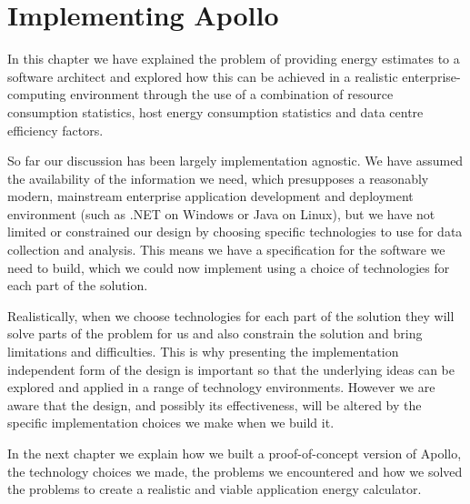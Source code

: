 \section{Implementing Apollo}

In this chapter we have explained the problem of providing energy estimates to a software architect and explored how this can be achieved in a realistic enterprise-computing environment through the use of a combination of resource consumption statistics, host energy consumption statistics and data centre efficiency factors.

So far our discussion has been largely implementation agnostic.  We have assumed the availability of the information we need, which presupposes a reasonably modern, mainstream enterprise application development and deployment environment (such as .NET on Windows or Java on Linux), but we have not limited or constrained our design by choosing specific technologies to use for data collection and analysis.  This means we have a specification for the software we need to build, which we could now implement using a choice of technologies for each part of the solution.

Realistically, when we choose technologies for each part of the solution they will solve parts of the problem for us and also constrain the solution and bring limitations and difficulties.  This is why presenting the implementation independent form of the design is important so that the underlying ideas can be explored and applied in a range of technology environments.  However we are aware that the design, and possibly its effectiveness, will be altered by the specific implementation choices we make when we build it.

In the next chapter we explain how we built a proof-of-concept version of Apollo, the technology choices we made, the problems we encountered and how we solved the problems to create a realistic and viable application energy calculator.

